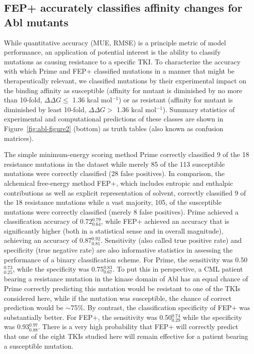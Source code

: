 \documentclass[phd,tocprelim]{cornell}
\begin{document}
\subsection{FEP+ accurately classifies affinity changes for Abl mutants}
While quantitative accuracy (MUE, RMSE) is a principle metric of model performance, an application of potential interest is the ability to classify mutations as causing resistance to a specific TKI.
To characterize the accuracy with which Prime and FEP+ classified mutations in a manner that might be therapeutically relevant, we classified mutations by their experimental impact on the binding affinity as susceptible (affinity for mutant is diminished by no more than 10-fold, $\Delta \Delta G \leq$ 1.36 kcal mol$^{-1}$) or as resistant (affinity for mutant is diminished by least 10-fold, $\Delta \Delta G >$ 1.36 kcal mol$^{-1}$).    
Summary statistics of experimental and computational predictions of these classes are shown in Figure~\ref{fig:abl-figure2} (bottom) as truth tables (also known as confusion matrices).

The simple minimum-energy scoring method Prime correctly classified 9 of the 18 resistance mutations in the dataset while merely 85 of the 113 susceptible mutations were correctly classified (28 false positives).
In comparison, the alchemical free-energy method FEP+, which includes entropic and enthalpic contributions as well as explicit representation of solvent, correctly classified 9 of the 18 resistance mutations while a vast majority, 105, of the susceptible mutations were correctly classified (merely 8 false positives).
Prime achieved a classification accuracy of 0.72$^{0.79}_{0.64}$, while FEP+ achieved an accuracy that is significantly higher (both in a statistical sense and in overall magnitude), achieving an accuracy of 0.87$^{0.92}_{0.81}$.
Sensitivity (also called true positive rate) and specificity (true negative rate) are also informative statistics in assessing the performance of a binary classification scheme.
For Prime, the sensitivity was 0.50$^{0.73}_{0.25}$, while the specificity was 0.75$^{0.83}_{0.67}$.
To put this in perspective, a CML patient bearing a resistance mutation in the kinase domain of Abl has an equal chance of Prime correctly predicting this mutation would be resistant to one of the TKIs considered here, while if the mutation was susceptible, the chance of correct prediction would be $\sim$75\%.
By contrast, the classification specificity of FEP+ was substantially better.
For FEP+, the sensitivity was 0.50$^{0.74}_{0.29}$ while the specificity was 0.93$^{0.97}_{0.88}$.
There is a very high probability that FEP+ will correctly predict that one of the eight TKIs studied here will remain effective for a patient bearing a susceptible mutation. 
\end{document}
